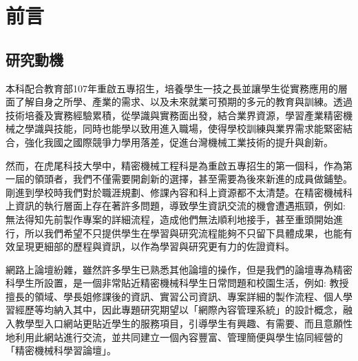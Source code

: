 \setcounter{chapter}{0}
\chapter{前言}
\setcounter{page}{1}  %
\renewcommand{\baselinestretch}{10} %
\section{研究動機}
\par
\renewcommand{\baselinestretch}{2} %
\twelve 本科配合教育部107年重啟五專招生，培養學生一技之長並讓學生從實務應用的層面了解自身之所學、產業的需求、以及未來就業可預期的多元的教育與訓練。透過技術培養及實務經驗累積，從學識與實務面出發，結合業界資源，學習產業精密機械之學識與技能，同時也能學以致用進入職場，使得學校訓練與業界需求能緊密結合，強化我國之國際競爭力學用落差，促進台灣機械工業技術的提升與創新。\\
\par
\renewcommand{\baselinestretch}{1} %
\twelve 然而，在虎尾科技大學中，精密機械工程科是為重啟五專招生的第一個科，作為第一屆的領頭者，我們不僅需要開創新的選擇，甚至需要為後來新進的成員做鋪墊。剛進到學校時我們對於職涯規劃、修課內容和科上資源都不太清楚。在精密機械科上資訊的執行層面上存在著許多問題，導致學生資訊交流的機會遭遇瓶頸，例如:無法得知先前製作專案的詳細流程，造成他們無法順利地接手，甚至重頭開始進行，所以我們希望不只提供學生在學習與研究流程能夠不只留下具體成果，也能有效呈現更細部的歷程與資訊，以作為學習與研究更有力的佐證資料。\\
\par
\renewcommand{\baselinestretch}{1} %
\twelve 網路上論壇紛雜，雖然許多學生已熟悉其他論壇的操作，但是我們的論壇專為精密科學生所設置，是一個非常貼近精密機械科學生日常問題和校園生活，例如: 教授擅長的領域、學長姐修課後的資訊、實習公司資訊、專案詳細的製作流程、個人學習經歷等均納入其中，因此專題研究期望以「網際內容管理系統」的設計概念，融入教學型入口網站更貼近學生的服務項目，引導學生有興趣、有需要、而且意願性地利用此網站進行交流，並共同建立一個內容豐富、管理簡便與學生協同經營的「精密機械科學習論壇」。
\par

\renewcommand{\baselinestretch}{20} %
